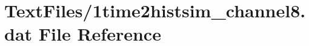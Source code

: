 \hypertarget{1time2histsim__channel8_8dat}{}\section{Text\+Files/1time2histsim\+\_\+channel8.dat File Reference}
\label{1time2histsim__channel8_8dat}
